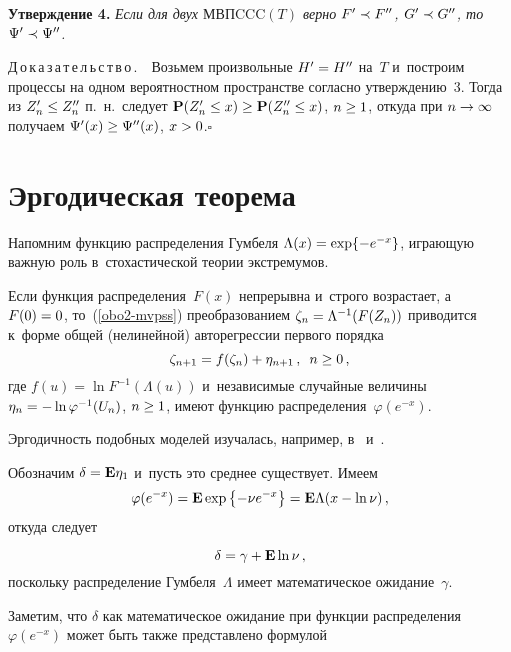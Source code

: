 \begin{multicols}{2}
\noindent
\textbf{Утверждение 4.} \textit{Если для двух $\mathrm{МВПCCC}(T)$ верно $F'\hm\prec F''$,
$G'\hm\prec G''$, то $\Psi'\hm\prec\Psi''$.}

\smallskip

\noindent
Д\,о\,к\,а\,з\,а\,т\,е\,л\,ь\,с\,т\,в\,о\,.\ \
Возьмем произвольные $H'\hm=H''$ на~$T$
и~по\-стро\-им процессы на одном вероятностном про\-стран\-ст\-ве 
со\-глас\-но утверж\-де\-нию~3.
Тогда из $Z'_n\hm\le Z''_n$ п.~н.\  следует
${\bf P}(Z'_n\hm\le x)\hm\ge {\bf P}(Z''_n\hm\le x)$, $n\hm\ge 1$,
откуда при $n\hm\to\infty$ получаем $\Psi'(x)\hm\ge\Psi''(x)$, $x\hm>0$.\hfill$\square$


\section{Эргодическая теорема}

Напомним функцию распределения Гумбеля
$\Lambda(x)\hm=\exp\{-e^{-x}\}$, игра\-ющую важ\-ную роль в~сто\-ха\-сти\-че\-ской 
тео\-рии экстремумов.

Если функция распределения~$F(x)$ непрерывна 
и~строго возрастает, а~$F(0)\hm=0$, то~(\ref{obo2-mvpss}) преобразованием
$\zeta_n\hm=\Lambda^{-1}(F(Z_n))$ приводится
к~форме общей (нелинейной) авторегрессии первого порядка
\begin{equation}
\label{nepr}
\zeta_{n+1}=f(\zeta_n)+\eta_{n+1}\,,\enskip n\ge 0\,,
\end{equation}
где $f(u)=\ln F^{-1}(\Lambda(u))$ и~независимые случайные величины
$\eta_n\hm=-\ln \varphi^{-1}(U_n)$, $n\hm\ge 1$, име\-ют функцию 
распределения~$\varphi(e^{-x})$.

Эргодичность подобных моделей изучалась, например, 
в~\cite[\S~8.4]{Borov} и~\cite{Bhat}.

Обозначим $\delta\hm={\bf E}\eta_1$ и~пусть это сред\-нее существует. Имеем
$$
\varphi(e^{-x})={\bf E}\exp\left\{-\nu e^{-x}\right\}={\bf E}\Lambda(x-\ln\nu)\,,
$$
откуда следует

\noindent
\begin{equation}
\label{oprdelta}
\delta=\gamma+{\bf E}\ln\nu\,,
\end{equation}
поскольку распределение Гумбеля~$\Lambda$ имеет математическое ожидание~$\gamma$.

Заметим, что $\delta$ как математическое ожидание при функции распределения
$\varphi(e^{-x})$ может быть так\-же пред\-став\-ле\-но формулой

\vspace*{-4pt}


\end{multicols}
